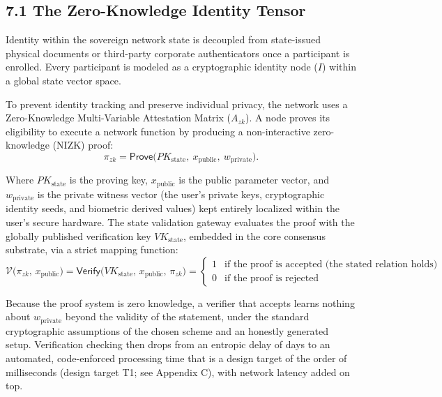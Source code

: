 \documentclass[11pt,a4paper]{article}
\theoremstyle{definition}
\theoremstyle{plain}
\theoremstyle{remark}
\begin{document}
\subsection*{7.1 The Zero-Knowledge Identity Tensor}
Identity within the sovereign network state is decoupled from state-issued physical documents or third-party corporate authenticators once a participant is enrolled. Every participant is modeled as a cryptographic identity node ($I$) within a global state vector space.

To prevent identity tracking and preserve individual privacy, the network uses a Zero-Knowledge Multi-Variable Attestation Matrix ($A_{zk}$). A node proves its eligibility to execute a network function by producing a non-interactive zero-knowledge (NIZK) proof:
\begin{equation}
\pi_{zk} = \mathsf{Prove}\big( PK_{\mathrm{state}},\ x_{\mathrm{public}},\ w_{\mathrm{private}} \big).
\end{equation}

Where $PK_{\mathrm{state}}$ is the proving key, $x_{\mathrm{public}}$ is the public parameter vector, and $w_{\mathrm{private}}$ is the private witness vector (the user's private keys, cryptographic identity seeds, and biometric derived values) kept entirely localized within the user's secure hardware. The state validation gateway evaluates the proof with the globally published verification key $VK_{\mathrm{state}}$, embedded in the core consensus substrate, via a strict mapping function:
\begin{equation}
\mathcal V\big( \pi_{zk},\, x_{\mathrm{public}} \big) = \mathsf{Verify}\big( VK_{\mathrm{state}},\, x_{\mathrm{public}},\, \pi_{zk} \big) =
\begin{cases}
1 & \text{if the proof is accepted (the stated relation holds)} \\
0 & \text{if the proof is rejected}
\end{cases}
\end{equation}

Because the proof system is zero knowledge, a verifier that accepts learns nothing about $w_{\mathrm{private}}$ beyond the validity of the statement, under the standard cryptographic assumptions of the chosen scheme and an honestly generated setup. Verification checking then drops from an entropic delay of days to an automated, code-enforced processing time that is a design target of the order of milliseconds (design target T1; see Appendix C), with network latency added on top.
\end{document}
